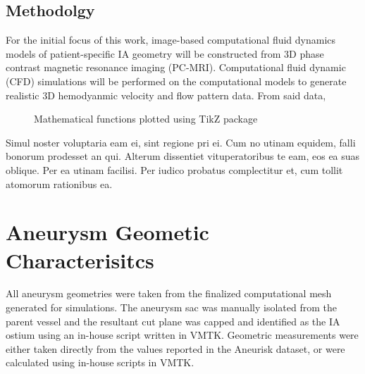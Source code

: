 \subsection{Methodolgy}\label{CHAPTER1_SECTION1_SUBSECTION2}
For the initial focus of this work, image-based computational fluid dynamics models of patient-specific IA geometry will be constructed from 3D phase contrast magnetic resonance imaging (PC-MRI). Computational fluid dynamic (CFD) simulations will be performed on the computational models to generate realistic 3D hemodyanmic velocity and flow pattern data. From said data, 


\begin{figure}[htb]
  \begin{center}
  \end{center}
  \caption{Mathematical functions plotted using TikZ package}
  \label{CHAPTER1_FIG02}
\end{figure}

Simul noster voluptaria eam ei, sint regione pri ei. Cum no utinam equidem, 
falli bonorum prodesset an qui. Alterum dissentiet vituperatoribus te eam, 
eos ea suas oblique. Per ea utinam facilisi. \cite{DMOL3_02,HPL_01,HPL_02}
Per iudico probatus complectitur et, cum tollit atomorum rationibus ea.

\section{Aneurysm Geometic Characterisitcs}\label{CHAPTER1_SECTION2}

All aneurysm geometries were taken from the finalized computational mesh generated for simulations. The aneurysm sac was manually isolated from the parent vessel and the resultant cut plane was capped and identified as the IA ostium using an in-house script written in VMTK. Geometric measurements were either taken directly from the values reported in the Aneurisk dataset, or were calculated using in-house scripts in VMTK. 

